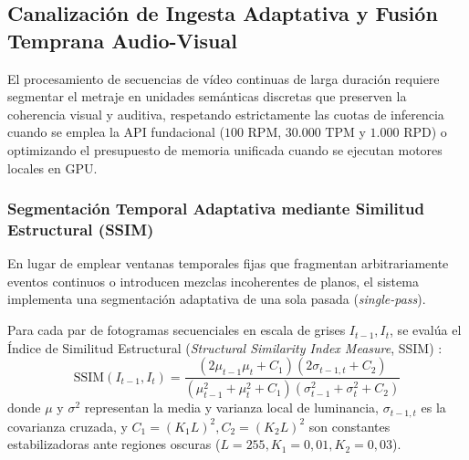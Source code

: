\subsection{Canalización de Ingesta Adaptativa y Fusión Temprana Audio-Visual}
\label{subsec:pipeline_ingesta_fasion_temprana}

El procesamiento de secuencias de vídeo continuas de larga duración requiere segmentar el metraje en unidades semánticas discretas que preserven la coherencia visual y auditiva, respetando estrictamente las cuotas de inferencia cuando se emplea la API fundacional ($100\text{ RPM}$, $30.000\text{ TPM}$ y $1.000\text{ RPD}$) \cite{gemini_emb2_docs} o optimizando el presupuesto de memoria unificada cuando se ejecutan motores locales en GPU.

\subsubsection{Segmentación Temporal Adaptativa mediante Similitud Estructural (SSIM)}
En lugar de emplear ventanas temporales fijas que fragmentan arbitrariamente eventos continuos o introducen mezclas incoherentes de planos, el sistema implementa una segmentación adaptativa de una sola pasada (\textit{single-pass}). 

Para cada par de fotogramas secuenciales en escala de grises $I_{t-1}, I_t$, se evalúa el Índice de Similitud Estructural (\textit{Structural Similarity Index Measure}, SSIM) \cite{wang2004ssim}:
\begin{equation}
    \text{SSIM}(I_{t-1}, I_t) = \frac{(2\mu_{t-1}\mu_t + C_1)(2\sigma_{t-1,t} + C_2)}{(\mu_{t-1}^2 + \mu_t^2 + C_1)(\sigma_{t-1}^2 + \sigma_t^2 + C_2)}
\end{equation}
donde $\mu$ y $\sigma^2$ representan la media y varianza local de luminancia, $\sigma_{t-1,t}$ es la covarianza cruzada, y $C_1 = (K_1 L)^2, C_2 = (K_2 L)^2$ son constantes estabilizadoras ante regiones oscuras ($L=255, K_1=0,01, K_2=0,03$).

